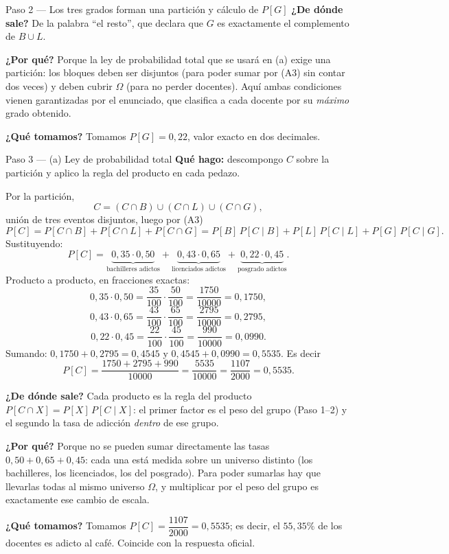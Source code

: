 \documentclass[11pt]{article}
\begin{document}
\begin{sol}
\begin{paso}{Paso 2 --- Los tres grados forman una partici\'on y c\'alculo de $P[G]$}
\textbf{¿De d\'onde sale?} De la palabra ``el resto'', que declara que $G$ es exactamente el complemento de $B\cup L$.

\textbf{¿Por qu\'e?} Porque la ley de probabilidad total que se usar\'a en (a) exige una partici\'on: los bloques deben ser disjuntos (para poder sumar por (A3) sin contar dos veces) y deben cubrir $\Omega$ (para no perder docentes). Aqu\'i ambas condiciones vienen garantizadas por el enunciado, que clasifica a cada docente por su \emph{m\'aximo} grado obtenido.

\textbf{¿Qu\'e tomamos?} Tomamos $P[G]=0{,}22$, valor exacto en dos decimales.
\end{paso}

\begin{paso}{Paso 3 --- (a) Ley de probabilidad total}
\textbf{Qu\'e hago:} descompongo $C$ sobre la partici\'on y aplico la regla del producto en cada pedazo.

Por la partici\'on,
\[
C=(C\cap B)\cup(C\cap L)\cup(C\cap G),
\]
uni\'on de tres eventos disjuntos, luego por (A3)
\[
P[C]=P[C\cap B]+P[C\cap L]+P[C\cap G]
=P[B]\,P[C\mid B]+P[L]\,P[C\mid L]+P[G]\,P[C\mid G].
\]
Sustituyendo:
\[
P[C]=\underbrace{0{,}35\cdot 0{,}50}_{\text{bachilleres adictos}}
+\underbrace{0{,}43\cdot 0{,}65}_{\text{licenciados adictos}}
+\underbrace{0{,}22\cdot 0{,}45}_{\text{posgrado adictos}} .
\]
Producto a producto, en fracciones exactas:
\[
0{,}35\cdot 0{,}50=\frac{35}{100}\cdot\frac{50}{100}=\frac{1750}{10000}=0{,}1750,
\]
\[
0{,}43\cdot 0{,}65=\frac{43}{100}\cdot\frac{65}{100}=\frac{2795}{10000}=0{,}2795,
\]
\[
0{,}22\cdot 0{,}45=\frac{22}{100}\cdot\frac{45}{100}=\frac{990}{10000}=0{,}0990 .
\]
Sumando: $0{,}1750+0{,}2795=0{,}4545$ y $0{,}4545+0{,}0990=0{,}5535$. Es decir
\[
P[C]=\frac{1750+2795+990}{10000}=\frac{5535}{10000}=\frac{1107}{2000}=0{,}5535 .
\]

\textbf{¿De d\'onde sale?} Cada producto es la regla del producto $P[C\cap X]=P[X]\,P[C\mid X]$: el primer factor es el peso del grupo (Paso 1--2) y el segundo la tasa de adicci\'on \emph{dentro} de ese grupo.

\textbf{¿Por qu\'e?} Porque no se pueden sumar directamente las tasas $0{,}50+0{,}65+0{,}45$: cada una est\'a medida sobre un universo distinto (los bachilleres, los licenciados, los del posgrado). Para poder sumarlas hay que llevarlas todas al mismo universo $\Omega$, y multiplicar por el peso del grupo es exactamente ese cambio de escala.

\textbf{¿Qu\'e tomamos?} Tomamos $P[C]=\dfrac{1107}{2000}=0{,}5535$; es decir, el $55{,}35\%$ de los docentes es adicto al caf\'e. Coincide con la respuesta oficial.
\end{paso}


\end{sol}
\end{document}
